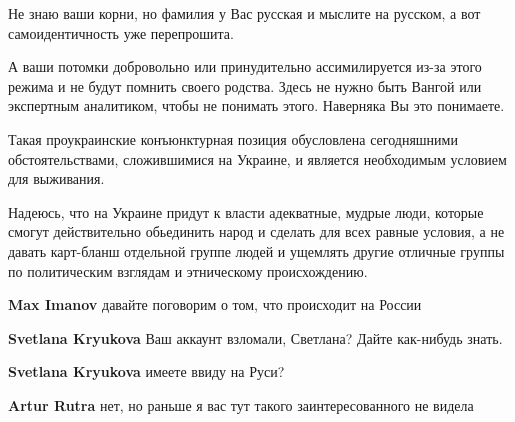 \begin{itemize}
Не знаю ваши корни, но фамилия у Вас русская и мыслите на русском, а вот
самоидентичность уже перепрошита. 

А ваши потомки добровольно или принудительно ассимилируется из-за этого режима
и не будут помнить своего родства. Здесь не нужно быть Вангой или экспертным
аналитиком, чтобы не понимать этого. Наверняка Вы это понимаете. 

Такая проукраинские конъюнктурная позиция обусловлена сегодняшними
обстоятельствами, сложившимися на Украине, и является необходимым условием для
выживания. 

Надеюсь, что на Украине придут к власти адекватные, мудрые люди, которые смогут
действительно обьединить народ и сделать для всех равные условия, а не давать
карт-бланш отдельной группе людей и ущемлять другие отличные группы по
политическим взглядам и этническому происхождению.

\begin{itemize}

 
\textbf{Max Imanov} давайте поговорим о том, что происходит на России

 
\textbf{Svetlana Kryukova} Ваш аккаунт взломали, Светлана?
Дайте как-нибудь знать.

 
\textbf{Svetlana Kryukova} имеете ввиду на Руси?


 
\textbf{Artur Rutra} нет, но раньше я вас тут такого заинтересованного не видела

 

\end{itemize}
\end{itemize}
